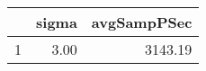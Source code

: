 \begin{table}[h]
\centering
\begin{tabular}{rrr}
  \hline
 & sigma & avgSampPSec \\ 
  \hline
1 & 3.00 & 3143.19 \\ 
   \hline
\end{tabular}
\end{table}
